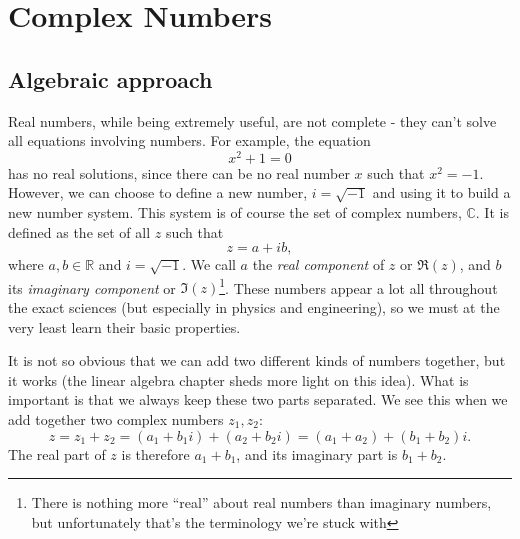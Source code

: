 
\section{Complex Numbers}
\subsection{Algebraic approach}
Real numbers, while being extremely useful, are not complete - they can't solve all equations involving numbers. For example, the equation
\begin{equation}
	x^{2} + 1 = 0
	\label{eq:no_real_solutions}
\end{equation}
has no real solutions, since there can be no real number $x$ such that $x^{2}=-1$. However, we can choose to define a new number, $i=\sqrt{-1}$ and using it to build a new number system. This system is of course the set of complex numbers, $\mathbb{C}$. It is defined as the set of all $z$ such that
\begin{equation}
	z = a+ib,
	\label{eq:complex_number}
\end{equation}
where $a,b\in\mathbb{R}$ and $i=\sqrt{-1}$. We call $a$ the \emph{real component} of $z$ or $\Re(z)$, and $b$ its \emph{imaginary component} or $\Im(z)$\footnote{There is nothing more ``real'' about real numbers than imaginary numbers, but unfortunately that's the terminology we're stuck with \shrug}. These numbers appear a lot all throughout the exact sciences (but especially in physics and engineering), so we must at the very least learn their basic properties.

It is not so obvious that we can add two different kinds of numbers together, but it works (the linear algebra chapter sheds more light on this idea). What is important is that we always keep these two parts separated. We see this when we add together two complex numbers $z_{1},z_{2}$:
\begin{equation}
	z = z_{1}+z_{2} = \left( a_{1}+b_{1}i \right) + \left( a_{2}+b_{2}i \right) = \left( a_{1}+a_{2} \right) + \left( b_{1}+b_{2} \right)i.
	\label{eq:complex_addition}
\end{equation}
The real part of $z$ is therefore $a_{1}+b_{1}$, and its imaginary part is $b_{1}+b_{2}$.


